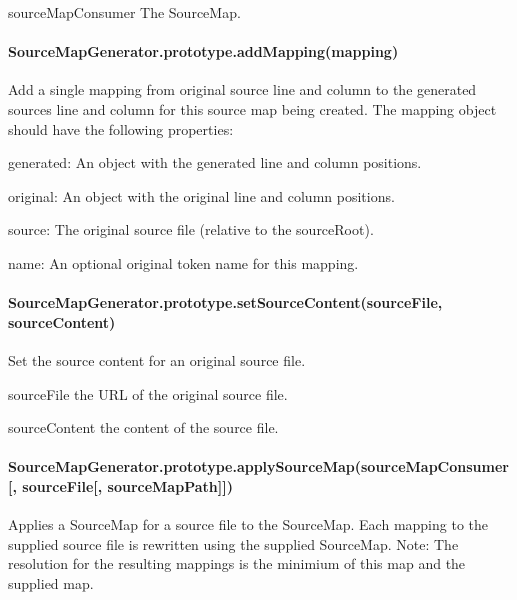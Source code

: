 \begin{DoxyItemize}
\item {\ttfamily source\+Map\+Consumer} The Source\+Map.
\end{DoxyItemize}

\paragraph*{Source\+Map\+Generator.\+prototype.\+add\+Mapping(mapping)}

Add a single mapping from original source line and column to the generated source\textquotesingle{}s line and column for this source map being created. The mapping object should have the following properties\+:


\begin{DoxyItemize}
\item {\ttfamily generated}\+: An object with the generated line and column positions.
\item {\ttfamily original}\+: An object with the original line and column positions.
\item {\ttfamily source}\+: The original source file (relative to the source\+Root).
\item {\ttfamily name}\+: An optional original token name for this mapping.
\end{DoxyItemize}

\paragraph*{Source\+Map\+Generator.\+prototype.\+set\+Source\+Content(source\+File, source\+Content)}

Set the source content for an original source file.


\begin{DoxyItemize}
\item {\ttfamily source\+File} the U\+R\+L of the original source file.
\item {\ttfamily source\+Content} the content of the source file.
\end{DoxyItemize}

\paragraph*{Source\+Map\+Generator.\+prototype.\+apply\+Source\+Map(source\+Map\+Consumer\mbox{[}, source\+File\mbox{[}, source\+Map\+Path\mbox{]}\mbox{]})}

Applies a Source\+Map for a source file to the Source\+Map. Each mapping to the supplied source file is rewritten using the supplied Source\+Map. Note\+: The resolution for the resulting mappings is the minimium of this map and the supplied map.


